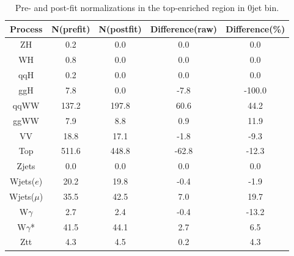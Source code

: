 \begin{table}
\begin{center}
\begin{tabular}{c|cc|cc}
\hline
\hline
Process     &    N(prefit) &   N(postfit) & Difference(raw) &  Difference(\%)  \\  
\hline
\hline
ZH &        0.2 &        0.0 &        0.0 &        0.0        \\
WH &        0.8 &        0.0 &        0.0 &        0.0        \\
qqH &        0.2 &        0.0 &        0.0 &        0.0        \\
ggH &        7.8 &        0.0 &       -7.8 &     -100.0        \\
\hline
qqWW &      137.2 &      197.8 &       60.6 &       44.2        \\
ggWW &        7.9 &        8.8 &        0.9 &       11.9        \\
\hline
VV &       18.8 &       17.1 &       -1.8 &       -9.3        \\
\hline
Top &      511.6 &      448.8 &      -62.8 &      -12.3        \\
\hline
Zjets &        0.0 &        0.0 &        0.0 &        0.0        \\
\hline
Wjets($e$) &       20.2 &       19.8 &       -0.4 &       -1.9        \\
Wjets($\mu$) &       35.5 &       42.5 &        7.0 &       19.7        \\
\hline
W$\gamma$ &        2.7 &        2.4 &       -0.4 &      -13.2        \\
W$\gamma$* &       41.5 &       44.1 &        2.7 &        6.5        \\
\hline
Ztt &        4.3 &        4.5 &        0.2 &        4.3        \\
       \hline
\hline
\end{tabular}
\caption{Pre- and post-fit normalizations in the top-enriched region in 0jet bin.}
\label{tab:fitval_norm_top_0j}
\end{center}
\end{table}

